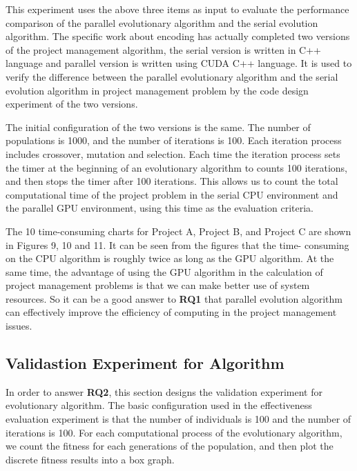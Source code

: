 
This experiment uses the above three items as input to evaluate the 
performance comparison of the parallel evolutionary algorithm and the 
serial evolution algorithm. The specific work about encoding has actually 
completed two versions of the project management algorithm, the serial 
version is written in C++ language and parallel version is written using CUDA
C++ language. It is used to verify the difference between the parallel 
evolutionary algorithm and the serial evolution algorithm in project 
management problem by the code design experiment of the two versions.


The initial configuration of the two versions 
is the same. The number of populations is 1000, and the number of iterations 
is 100. Each iteration process includes crossover, mutation and selection. 
Each time the iteration process sets the timer at the beginning of an 
evolutionary algorithm to counts 100 iterations, and then stops the timer 
after 100 iterations. This allows us to count the total computational time of 
the project problem in the serial CPU environment and the parallel GPU 
environment, using this time as the evaluation criteria.


The 10 time-consuming charts for Project A, Project B, and Project C are 
shown in Figures 9, 10 and 11. It can be seen from the figures that the time-
consuming on the CPU algorithm is roughly twice as long as the GPU algorithm. 
At the same time, the advantage of using the GPU algorithm in the calculation 
of project management problems is that we can make better use of system 
resources. So it can be a good answer to \textbf{RQ1} that parallel evolution 
algorithm can effectively improve the efficiency of computing in the project 
management issues.


\subsection{Validastion Experiment for Algorithm}
%
In order to answer \textbf{RQ2}, this section designs the validation experiment for 
evolutionary algorithm. The basic configuration used in the effectiveness 
evaluation experiment is that the number of individuals is 100 and the number 
of iterations is 100. For each computational 
process of the evolutionary algorithm, we count the fitness for each 
generations of the population, and then plot the discrete fitness results 
into a box graph.


